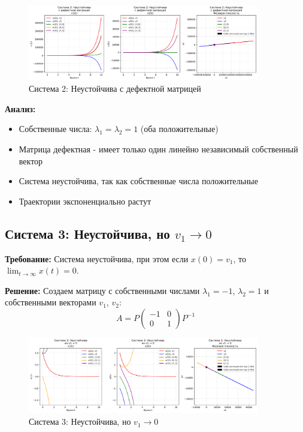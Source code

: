 \begin{figure}[H]
    \centering
    \includegraphics[width=0.9\textwidth]{images/task1/system2_unstable_defective.png}
    \caption{Система 2: Неустойчива с дефектной матрицей}
\end{figure}

\textbf{Анализ:}
\begin{itemize}
    \item Собственные числа: $\lambda_1 = \lambda_2 = 1$ (оба положительные)
    \item Матрица дефектная - имеет только один линейно независимый собственный вектор
    \item Система неустойчива, так как собственные числа положительные
    \item Траектории экспоненциально растут
\end{itemize}

\subsection*{Система 3: Неустойчива, но $v_1 \to 0$}

\textbf{Требование:} Система неустойчива, при этом если $x(0) = v_1$, то $\lim_{t \to \infty} x(t) = 0$.

\textbf{Решение:} Создаем матрицу с собственными числами $\lambda_1 = -1$, $\lambda_2 = 1$ и собственными векторами $v_1$, $v_2$:
\begin{equation}
A = P \begin{pmatrix} -1 & 0 \\ 0 & 1 \end{pmatrix} P^{-1}
\end{equation}

\begin{figure}[H]
    \centering
    \includegraphics[width=0.9\textwidth]{images/task1/system3_unstable_v1_to_zero.png}
    \caption{Система 3: Неустойчива, но $v_1 \to 0$}
\end{figure}

